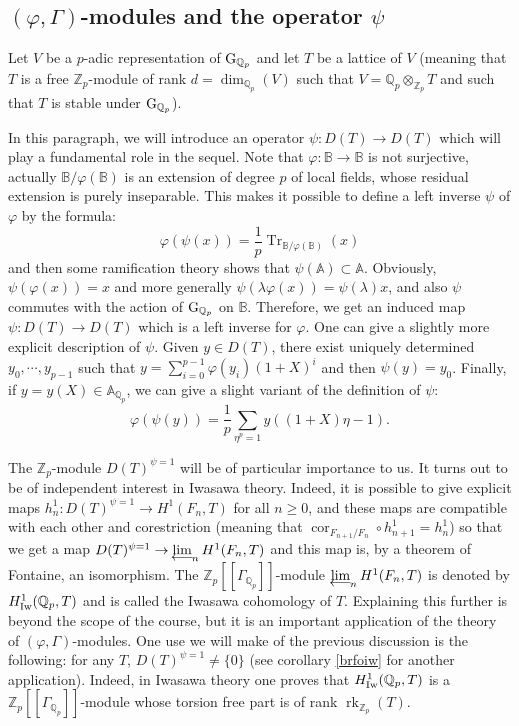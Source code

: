 \documentclass[11pt]{amsart}
\def\limproj{\mathop{\oalign{{\rm lim}\cr 
\hidewidth$\longleftarrow$\hidewidth\cr}}}
\def\Z{{\mathbb Z}_p}
\def\Q{{\mathbb Q}_p}
\def\g{{\rm G}_{\Q}}
\def\ra{\rightarrow}
\def\Qp{{\mathbb Q}_p}
\def\aa{\mathbb{A}}
\def\bb{\mathbb{B}}
\def\on{\operatorname}
\begin{document}
\subsection{$(\varphi,\Gamma)$-modules and the operator $\psi$}\label{psy} 
Let $V$ be a $p$-adic representation of $\g$ and let $T$ be a lattice 
of $V$ (meaning that $T$ is a free $\Z$-module of rank 
$d=\dim_{\Q}(V)$ such that $V = \Q \otimes_{\Z} T$ and such that $T$ 
is stable under $\g$). 
 
In this paragraph, we will introduce an operator $\psi: D(T) \ra D(T)$ 
which will play a fundamental role in the sequel. Note that $\varphi: 
\bb \ra \bb$ is not surjective, actually $\bb / 
\varphi(\bb)$ is an extension of degree $p$ of local fields, whose 
residual extension is purely inseparable. This makes it possible to 
define a left inverse $\psi$ of $\varphi$ by the formula: 
\[ \varphi(\psi(x)) = \frac{1}{p} \on{Tr}_{\bb / \varphi(\bb)} (x) \] 
and then some ramification theory shows that $\psi(\aa) \subset 
\aa$. Obviously, $\psi(\varphi(x))=x$ and more generally $\psi(\lambda 
\varphi(x)) = \psi(\lambda)x$,  
and also $\psi$ commutes with the 
action of $\g$ on $\bb$. Therefore, we get an induced map $\psi: D(T) 
\ra D(T)$ which is a left inverse for $\varphi$. One can give a slightly 
more explicit description of $\psi$. Given $y \in D(T)$, there exist 
uniquely determined $y_0,\cdots,y_{p-1}$ such that $y=\sum_{i=0}^{p-1} 
\varphi(y_i) (1+X)^i$ and then $\psi(y)=y_0$. Finally, 
if $y=y(X) \in \aa_{\Qp}$, we can give a slight variant of the definition 
of $\psi$:  
\[ \varphi(\psi(y)) = \frac{1}{p} \sum_{\eta^p=1} y((1+X)\eta-1). \] 
 
The $\Z$-module $D(T)^{\psi=1}$ will be of particular importance to 
us. It turns out to be of independent interest in Iwasawa 
theory. Indeed, it is possible to give explicit maps $h^1_n : 
D(T)^{\psi=1} \ra H^1(F_n,T)$ for all $n \geq 0$, and these maps are 
compatible with each other and corestriction (meaning that 
$\on{cor}_{F_{n+1}/F_n} \circ h^1_{n+1} = h^1_n$) so that we get a map 
$D(T)^{\psi=1} \ra \limproj_n  H^1(F_n,T)$ and this map is, by a 
theorem of Fontaine, an isomorphism. The $\Z[[\Gamma_{\Q}]]$-module  
$\limproj_n  H^1(F_n,T)$ is denoted by $H^1_{\rm Iw}(\Q,T)$ and is 
called the Iwasawa cohomology of $T$. Explaining this further is 
beyond the scope of the course, but it is an important application of 
the theory of $(\varphi,\Gamma)$-modules. One use we will make of 
the previous discussion is the following: for any $T$, $D(T)^{\psi=1} 
\neq \{0\}$ (see corollary \ref{brfoiw} for another application).
Indeed, in Iwasawa theory one proves that $H^1_{\rm 
Iw}(\Q,T)$ is a $\Z[[\Gamma_{\Q}]]$-module whose torsion free part is 
of rank $\on{rk}_{\Z}(T)$.  
 
\end{document}
